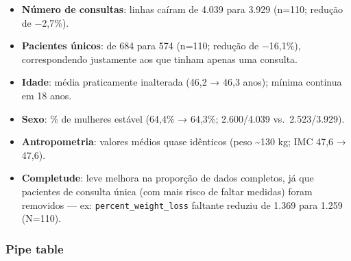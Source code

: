 \documentclass[
]{article}
\providecommand{\tightlist}{%
  \setlength{\itemsep}{0pt}\setlength{\parskip}{0pt}}\usepackage{longtable,booktabs,array}
\begin{document}
\begin{itemize}
\tightlist
\item
  \textbf{Número de consultas}: linhas caíram de 4.039 para 3.929
  (n=110; redução de −2,7\%).\\
\item
  \textbf{Pacientes únicos}: de 684 para 574 (n=110; redução de
  −16,1\%), correspondendo justamente aos que tinham apenas uma
  consulta.\\
\item
  \textbf{Idade}: média praticamente inalterada (46,2 → 46,3 anos);
  mínima continua em 18 anos.\\
\item
  \textbf{Sexo}: \% de mulheres estável (64,4\% → 64,3\%; 2.600/4.039
  vs.~2.523/3.929).\\
\item
  \textbf{Antropometria}: valores médios quase idênticos (peso
  \textasciitilde130 kg; IMC 47,6 → 47,6).\\
\item
  \textbf{Completude}: leve melhora na proporção de dados completos, já
  que pacientes de consulta única (com mais risco de faltar medidas)
  foram removidos --- ex: \texttt{percent\_weight\_loss} faltante
  reduziu de 1.369 para 1.259 (N=110).
\end{itemize}

\subsubsection{Pipe table}\label{pipe-table}
\end{document}
